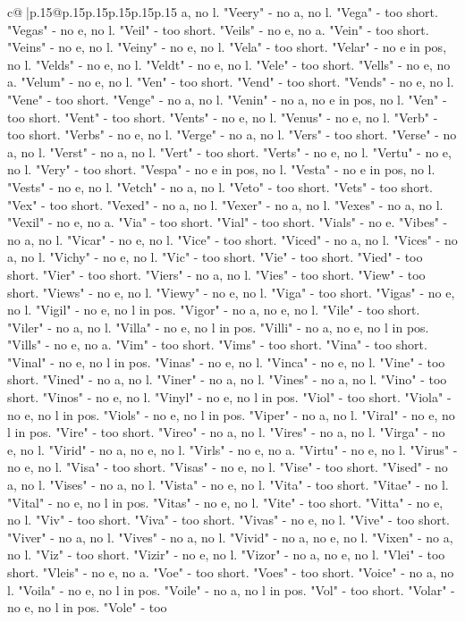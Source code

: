 \documentclass{article}
\begin{document}
{\begin{supertabular}{c@{$\;$}|p{.15\linewidth}@{}p{.15\linewidth}p{.15\linewidth}p{.15\linewidth}p{.15\linewidth}p{.15\linewidth}}
{{{a, no l. "Veery" {-} no a, no l. "Vega" {-} too short. "Vegas" {-} no e, no l. "Veil" {-} too short. "Veils" {-} no e, no a. "Vein" {-} too short. "Veins" {-} no e, no l. "Veiny" {-} no e, no l. "Vela" {-} too short. "Velar" {-} no e in pos, no l. "Velds" {-} no e, no l. "Veldt" {-} no e, no l. "Vele" {-} too short. "Vells" {-} no e, no a. "Velum" {-} no e, no l. "Ven" {-} too short. "Vend" {-} too short. "Vends" {-} no e, no l. "Vene" {-} too short. "Venge" {-} no a, no l. "Venin" {-} no a, no e in pos, no l. "Ven" {-} too short. "Vent" {-} too short. "Vents" {-} no e, no l. "Venus" {-} no e, no l. "Verb" {-} too short. "Verbs" {-} no e, no l. "Verge" {-} no a, no l. "Vers" {-} too short. "Verse" {-} no a, no l. "Verst" {-} no a, no l. "Vert" {-} too short. "Verts" {-} no e, no l. "Vertu" {-} no e, no l. "Very" {-} too short. "Vespa" {-} no e in pos, no l. "Vesta" {-} no e in pos, no l. "Vests" {-} no e, no l. "Vetch" {-} no a, no l. "Veto" {-} too short. "Vets" {-} too short. "Vex" {-} too short. "Vexed" {-} no a, no l. "Vexer" {-} no a, no l. "Vexes" {-} no a, no l. "Vexil" {-} no e, no a. "Via" {-} too short. "Vial" {-} too short. "Vials" {-} no e. "Vibes" {-} no a, no l. "Vicar" {-} no e, no l. "Vice" {-} too short. "Viced" {-} no a, no l. "Vices" {-} no a, no l. "Vichy" {-} no e, no l. "Vic" {-} too short. "Vie" {-} too short. "Vied" {-} too short. "Vier" {-} too short. "Viers" {-} no a, no l. "Vies" {-} too short. "View" {-} too short. "Views" {-} no e, no l. "Viewy" {-} no e, no l. "Viga" {-} too short. "Vigas" {-} no e, no l. "Vigil" {-} no e, no l in pos. "Vigor" {-} no a, no e, no l. "Vile" {-} too short. "Viler" {-} no a, no l. "Villa" {-} no e, no l in pos. "Villi" {-} no a, no e, no l in pos. "Vills" {-} no e, no a. "Vim" {-} too short. "Vims" {-} too short. "Vina" {-} too short. "Vinal" {-} no e, no l in pos. "Vinas" {-} no e, no l. "Vinca" {-} no e, no l. "Vine" {-} too short. "Vined" {-} no a, no l. "Viner" {-} no a, no l. "Vines" {-} no a, no l. "Vino" {-} too short. "Vinos" {-} no e, no l. "Vinyl" {-} no e, no l in pos. "Viol" {-} too short. "Viola" {-} no e, no l in pos. "Viols" {-} no e, no l in pos. "Viper" {-} no a, no l. "Viral" {-} no e, no l in pos. "Vire" {-} too short. "Vireo" {-} no a, no l. "Vires" {-} no a, no l. "Virga" {-} no e, no l. "Virid" {-} no a, no e, no l. "Virls" {-} no e, no a. "Virtu" {-} no e, no l. "Virus" {-} no e, no l. "Visa" {-} too short. "Visas" {-} no e, no l. "Vise" {-} too short. "Vised" {-} no a, no l. "Vises" {-} no a, no l. "Vista" {-} no e, no l. "Vita" {-} too short. "Vitae" {-} no l. "Vital" {-} no e, no l in pos. "Vitas" {-} no e, no l. "Vite" {-} too short. "Vitta" {-} no e, no l. "Viv" {-} too short. "Viva" {-} too short. "Vivas" {-} no e, no l. "Vive" {-} too short. "Viver" {-} no a, no l. "Vives" {-} no a, no l. "Vivid" {-} no a, no e, no l. "Vixen" {-} no a, no l. "Viz" {-} too short. "Vizir" {-} no e, no l. "Vizor" {-} no a, no e, no l. "Vlei" {-} too short. "Vleis" {-} no e, no a. "Voe" {-} too short. "Voes" {-} too short. "Voice" {-} no a, no l. "Voila" {-} no e, no l in pos. "Voile" {-} no a, no l in pos. "Vol" {-} too short. "Volar" {-} no e, no l in pos. "Vole" {-} too }}}
\end{supertabular}}
\end{document}
